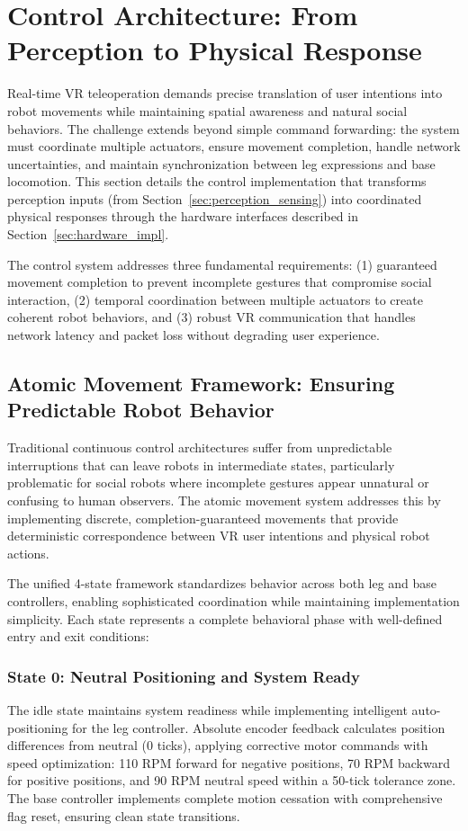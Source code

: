 \section{Control Architecture: From Perception to Physical Response}
\label{sec:control_implementation}
Real-time VR teleoperation demands precise translation of user intentions into robot movements while maintaining spatial awareness and natural social behaviors. The challenge extends beyond simple command forwarding: the system must coordinate multiple actuators, ensure movement completion, handle network uncertainties, and maintain synchronization between leg expressions and base locomotion. This section details the control implementation that transforms perception inputs (from Section~\ref{sec:perception_sensing}) into coordinated physical responses through the hardware interfaces described in Section~\ref{sec:hardware_impl}.

The control system addresses three fundamental requirements: (1) guaranteed movement completion to prevent incomplete gestures that compromise social interaction, (2) temporal coordination between multiple actuators to create coherent robot behaviors, and (3) robust VR communication that handles network latency and packet loss without degrading user experience.

\subsection{Atomic Movement Framework: Ensuring Predictable Robot Behavior}

Traditional continuous control architectures suffer from unpredictable interruptions that can leave robots in intermediate states, particularly problematic for social robots where incomplete gestures appear unnatural or confusing to human observers. The atomic movement system addresses this by implementing discrete, completion-guaranteed movements that provide deterministic correspondence between VR user intentions and physical robot actions.

The unified 4-state framework standardizes behavior across both leg and base controllers, enabling sophisticated coordination while maintaining implementation simplicity. Each state represents a complete behavioral phase with well-defined entry and exit conditions:

\subsubsection{State 0: Neutral Positioning and System Ready}
The idle state maintains system readiness while implementing intelligent auto-positioning for the leg controller. Absolute encoder feedback calculates position differences from neutral (0 ticks), applying corrective motor commands with speed optimization: 110 RPM forward for negative positions, 70 RPM backward for positive positions, and 90 RPM neutral speed within a 50-tick tolerance zone. The base controller implements complete motion cessation with comprehensive flag reset, ensuring clean state transitions.

